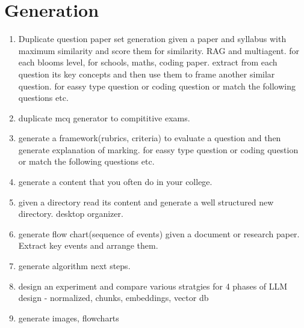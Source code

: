 \section{Generation}
    \begin{enumerate}
        \item Duplicate question paper set generation given a paper and syllabus with maximum similarity and score them for similarity. RAG and multiagent. for each blooms level, for schools, maths, coding paper. extract from each question its key concepts and then use them to frame another similar question. for eassy type question or coding question or match the following questions etc.

        \item duplicate mcq generator to compititive exams.

        \item generate a framework(rubrics, criteria) to evaluate a question and then generate explanation of marking. for eassy type question or coding question or match the following questions etc.

        \item generate a content that you often do in your college.

        \item given a directory read its content and generate a well structured new directory. desktop organizer.

        \item generate flow chart(sequence of events) given a document or research paper. Extract key events and arrange them.

        \item generate algorithm next steps.
        
        \item design an experiment and compare various stratgies for 4 phases of LLM design - normalized, chunks, embeddings, vector db

		\item generate images, flowcharts
		
		
    \end{enumerate}


